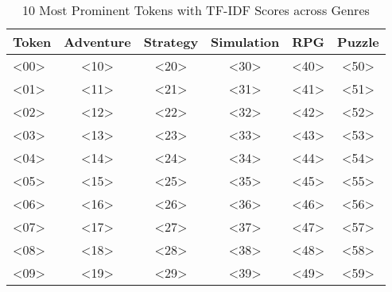 \begin{table}[h]
    \centering
    \begin{tabular}{l|c|c|c|c|c}
        Token & Adventure & Strategy & Simulation & RPG & Puzzle \\
        \hline
        <00> & <10> & <20> & <30> & <40> & <50> \\
        <01> & <11> & <21> & <31> & <41> & <51> \\
        <02> & <12> & <22> & <32> & <42> & <52> \\
        <03> & <13> & <23> & <33> & <43> & <53> \\
        <04> & <14> & <24> & <34> & <44> & <54> \\
        <05> & <15> & <25> & <35> & <45> & <55> \\
        <06> & <16> & <26> & <36> & <46> & <56> \\
        <07> & <17> & <27> & <37> & <47> & <57> \\
        <08> & <18> & <28> & <38> & <48> & <58> \\
        <09> & <19> & <29> & <39> & <49> & <59>
    \end{tabular}
    \caption{10 Most Prominent Tokens with TF-IDF Scores across Genres}
    \label{tab:top_tokens_by_genre}
\end{table}